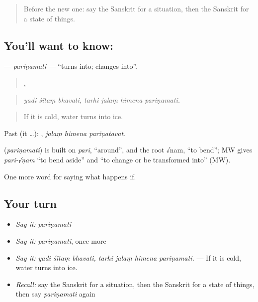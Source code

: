 \label{lesson:SA-C370-parinamati}



\begin{quote}
Before the new one: say the Sanskrit for a situation, then the Sanskrit for a state of things.
\end{quote}

\subsection*{You'll want to know: }
\textbf{} — \emph{pariṇamati} — \textquotedblleft{}turns into; changes into\textquotedblright{}.

\begin{quote}
  ,    
\end{quote}

\begin{quote}
\emph{yadi śītaṃ bhavati, tarhi jalaṃ himena pariṇamati.}
\end{quote}

\begin{quote}
If it is cold, water turns into ice.
\end{quote}

Past (it …):   , \emph{jalaṃ himena pariṇatavat}.

\begin{cousinweb}
\textbf{} (\emph{pariṇamati}) is built on \emph{pari}, \textquotedblleft{}around\textquotedblright{}, and the root √nam, \textquotedblleft{}to bend\textquotedblright{}; MW gives \emph{pari-√ṇam} \textquotedblleft{}to bend aside\textquotedblright{} and \textquotedblleft{}to change or be transformed into\textquotedblright{} (MW).
\end{cousinweb}

\begin{grammarlens}[title={What you've built}]
One more word for saying what happens if.
\end{grammarlens}

\subsection*{Your turn}
\begin{itemize}
\raggedright
  \item \emph{Say it:} \emph{pariṇamati}
  \item \emph{Say it:} \emph{pariṇamati}, once more
  \item \emph{Say it:} \emph{yadi śītaṃ bhavati, tarhi jalaṃ himena pariṇamati.} — If it is cold, water turns into ice.
  \item \emph{Recall:} say the Sanskrit for a situation, then the Sanskrit for a state of things, then say \emph{pariṇamati} again
\end{itemize}

